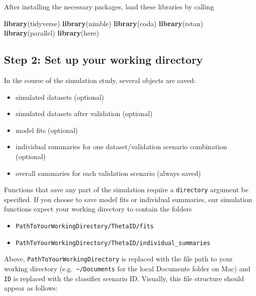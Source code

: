 \documentclass[
]{article}
\newenvironment{Shaded}{\begin{snugshade}}{\end{snugshade}}
\newcommand{\FunctionTok}[1]{\textcolor[rgb]{0.13,0.29,0.53}{\textbf{#1}}}
\newcommand{\NormalTok}[1]{#1}
\providecommand{\tightlist}{%
  \setlength{\itemsep}{0pt}\setlength{\parskip}{0pt}}
\begin{document}
\linespread{1}

After installing the necessary packages, load these libraries by calling

\linespread{1}

\begin{Shaded}
\begin{Highlighting}[]
\FunctionTok{library}\NormalTok{(tidyverse)}
\FunctionTok{library}\NormalTok{(nimble)}
\FunctionTok{library}\NormalTok{(coda)}
\FunctionTok{library}\NormalTok{(rstan)}
\FunctionTok{library}\NormalTok{(parallel)}
\FunctionTok{library}\NormalTok{(here)}
\end{Highlighting}
\end{Shaded}

\linespread{1}

\hypertarget{step-2-set-up-your-working-directory}{%
\subsection{Step 2: Set up your working directory}\label{step-2-set-up-your-working-directory}}

In the course of the simulation study, several objects are saved:

\begin{itemize}
\tightlist
\item
  simulated datasets (optional)
\item
  simulated datasets after validation (optional)
\item
  model fits (optional)
\item
  individual summaries for one dataset/validation scenario combination (optional)
\item
  overall summaries for each validation scenario (always saved)
\end{itemize}

Functions that save any part of the simulation require a \texttt{directory} argument be specified. If you choose to save model fits or individual summaries, our simulation functions expect your working directory to contain the folders

\begin{itemize}
\tightlist
\item
  \texttt{PathToYourWorkingDirectory/ThetaID/fits}
\item
  \texttt{PathToYourWorkingDirectory/ThetaID/individual\_summaries}
\end{itemize}

Above, \texttt{PathToYourWorkingDirectory} is replaced with the file path to your working directory (e.g.~\texttt{\textasciitilde{}/Documents} for the local Documents folder on Mac) and \texttt{ID} is replaced with the classifier scenario ID. Visually, this file structure should appear as follows:
\end{document}
